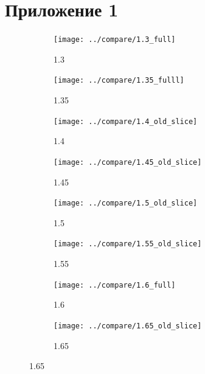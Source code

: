 \documentclass[a4paper]{article}
\begin{document}
	\section{Приложение 1}
	\begin{figure}[H]
		\begin{subfigure}{.5\textwidth}
		\texttt{[image: ../compare/1.3\_full]}
		\caption{1.3}
		\label{fig:21}
		\end{subfigure}
		\begin{subfigure}{.5\textwidth}
		\texttt{[image: ../compare/1.35\_fulll]}
		\caption{1.35}
		\label{fig:22}
		\end{subfigure}%
	
		\begin{subfigure}{.5\textwidth}
		\texttt{[image: ../compare/1.4\_old\_slice]}
		\caption{1.4}
		\label{fig:23}
		\end{subfigure}
		\begin{subfigure}{.5\textwidth}
		\texttt{[image: ../compare/1.45\_old\_slice]}
		\caption{1.45}
		\label{fig:24}
		\end{subfigure}%
	
		\begin{subfigure}{.5\textwidth}
		\texttt{[image: ../compare/1.5\_old\_slice]}
		\caption{1.5}
		\label{fig:25}
		\end{subfigure}
		\begin{subfigure}{.5\textwidth}
		\texttt{[image: ../compare/1.55\_old\_slice]}
		\caption{1.55}
		\label{fig:26}
		\end{subfigure}%
	
		\begin{subfigure}{.5\textwidth}
		\texttt{[image: ../compare/1.6\_full]}
		\caption{1.6}
		\label{fig:27}
		\end{subfigure}
		\begin{subfigure}{.5\textwidth}
		\texttt{[image: ../compare/1.65\_old\_slice]}
		\caption{1.65}
		\label{fig:28}
		\end{subfigure}%
	\end{figure}
\end{document}

